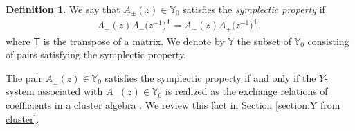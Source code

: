 \documentclass[pdftex]{sigma}
\numberwithin{equation}{section}
\theoremstyle{definition}
\newtheorem{Definition}[Theorem]{Definition}
\begin{document}
\begin{Definition}
 We say that $A_\pm (z) \in \mathbb{Y}_0$ satisfies the \emph{symplectic property} if
 \begin{align}\label{eq:symplectic property}
 A_+ (z) A_-\bigl(z^{-1}\bigr)^{\mathsf{T}} = A_- (z) A_+ \bigl(z^{-1}\bigr)^{\mathsf{T}},
 \end{align}
 where $\mathsf{T}$ is the transpose of a matrix.
 We denote by $\mathbb{Y}$ the subset of $\mathbb{Y}_0$ consisting of pairs satisfying the symplectic property.
\end{Definition}

The pair $A_\pm(z) \in \mathbb{Y}_0$ satisfies the symplectic property if and only if
the $Y$-system associated with $A_\pm (z) \in \mathbb{Y}_0$ is realized as the exchange relations of coefficients
in a cluster algebra \cite{mizuno2020difference}.
We review this fact in Section \ref{section:Y from cluster}.
\end{document}

